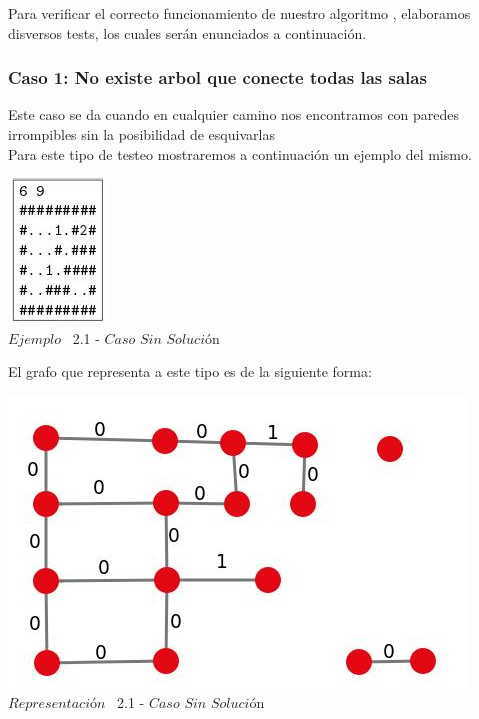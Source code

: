 \indent Para verificar el correcto funcionamiento de nuestro algoritmo , elaboramos disversos tests,
los cuales ser\'an enunciados a continuaci\'on.\\

\begin{center}
 \subsubsection*{Caso 1: No existe arbol que conecte todas las salas}
\end{center}

Este caso se da cuando en cualquier camino nos encontramos con paredes irrompibles sin la posibilidad de esquivarlas\\

 Para este tipo de testeo mostraremos a continuaci\'on un ejemplo del mismo.\\
 
\vspace*{0.3cm} \vspace*{0.3cm}
  \begin{center}
 \includegraphics[scale=1.6]{./EJ2/ej2sinsolucion.jpeg}
\\{$Ejemplo$ \ 2.1 - $Caso$ $Sin$ $Soluci$\'on}
  \end{center}
  \vspace*{0.3cm}

El grafo que representa a este tipo es de la siguiente forma:\\

\vspace*{0.3cm} \vspace*{0.3cm}
  \begin{center}
 \includegraphics[scale=0.5]{./EJ2/ej2grafosinsolucion.jpeg}
 \\{$Representación$ \ 2.1 - $Caso$ $Sin$ $Soluci$\'on}
  \end{center}
  \vspace*{0.3cm}



